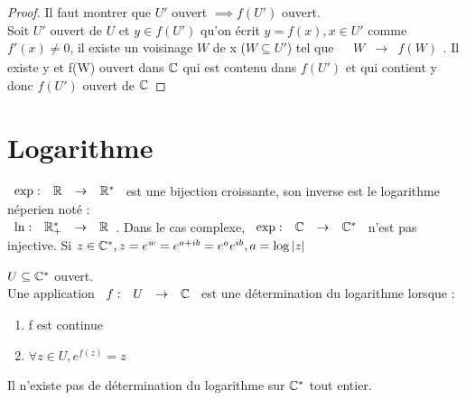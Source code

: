 \documentclass[]{report}
\begin{document}
\begin{proof}
    Il faut montrer que $U'$ ouvert $\implies f(U')$ ouvert.\\
    Soit $U'$ ouvert de $U$ et $y\in f(U')$ qu'on écrit $y=f(x),x\in U'$ comme $f'(x)\neq0$, il existe un voisinage $W$ de x ($W \subseteq U'$) tel que $\begin{array}{ccccc}
& W & \to & f(W)
\end{array}$. Il existe y et f(W) ouvert dans $\mathbb{C}$ qui est contenu dans $f(U')$ et qui contient y donc $f(U')$ ouvert de $\mathbb{C}$
\end{proof}

\section{Logarithme}

$\begin{array}{ccccc}
\exp : & \mathbb{R} & \to & \mathbb{R}^*
\end{array}$ est une bijection croissante, son inverse est le logarithme néperien noté :\\
$\begin{array}{ccccc}
\ln : & \mathbb{R}^*_+ & \to & \mathbb{R}
\end{array}$. Dans le cas complexe, $\begin{array}{ccccc}
\exp : & \mathbb{C} & \to & \mathbb{C}^*
\end{array}$ n'est pas injective. Si $z\in \mathbb{C}^*,z=e^w=e^{a+ib}=e^ae^{ib},a=\log |z|$

\begin{df}
    $U\subseteq\mathbb{C}^*$ ouvert.\\
    Une application $\begin{array}{ccccc}
f : & U & \to & \mathbb{C}
\end{array}$ est une détermination du logarithme lorsque :\begin{enumerate}
    \item f est continue
    \item $\forall z\in U,e^{f(z)}=z$
\end{enumerate}
\end{df}

\begin{prop}
    Il n'existe pas de détermination du logarithme sur $\mathbb{C}^*$ tout entier.
\end{prop}
\end{document}
